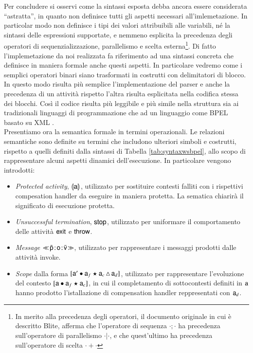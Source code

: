 Per concludere si osservi come la sintassi esposta debba ancora essere 
considerata ``astratta'', in quanto non definisce tutti gli aspetti necessari
all'imlemetazione. In particolar modo non definisce i tipi dei valori
attribuibili alle variabili, né la sintassi delle espressioni supportate, e
nemmeno esplicita la precedenza degli operatori di sequenzializzazione,
parallelismo e scelta esterna\footnote{In merito alla precedenza degli
operatori, il documento originale in cui è descritto Blite, afferma che
l'operatore di sequenza $\cdot ; \cdot$ ha precedenza
sull'operatore di parallelismo $\cdot | \cdot$, e che quest'ultimo ha precedenza
sull'operatore di scelta $\cdot + \cdot$}. Di fatto l'implemetazione da noi
realizzata fa riferimento ad una sintassi concreta che definisce in maniera
formale anche questi aspetti. In particolare vedremo come  i semplici
operatori binari siano trasformati in costrutti con 
delimitatori di blocco. In questo modo risulta più semplice
l'implementazione del parser 
e anche la
precedenza di un attività rispetto l'altra risulta esplicitata nella codifica
stessa dei blocchi. Così il codice risulta più leggibile e più simile nella
struttura sia ai tradizionali linguaggi di programmazione che ad un linguaggio come BPEL basato su XML .
\\

Presentiamo ora la semantica formale in termini operazionali. Le relazioni
semantiche sono definite su termini che includono ulteriori
simboli e costrutti, rispetto a quelli definiti dalla sintassi di Tabella
\ref{tab:syntaxwsbpel}, allo scopo di rappresentare alcuni aspetti dinamici
dell'esecuzione. In particolare vengono introdotti:

\begin{itemize}
  \item \emph{Protected activity}, $\llparenthesis {\sf a}\rrparenthesis$, utilizzato per sostituire
  contesti falliti con i rispettivi compesation handler da eseguire in maniera
  protetta. La sematica chiarirà il significato di esecuzione protetta.
  
  \item \emph{Unsuccessful termination}, ${\sf stop}$, utilizzato per uniformare il
  comportamento delle attività ${\sf exit}$ e ${\sf throw}$.
  
  \item \emph{Message} $\ll\!\tilde{{\sf p}}\! : \! {\sf o}\! : \! \bar{{\sf v}}\!\gg$, utilizzato per
  rappresentare i messaggi prodotti dalle attività invoke.
    
  \item \emph{Scope} dalla forma $[{\sf a}' \bullet {\sf a}_f \star {\sf a}_c\, \triangle\, {\sf a}_d]$,
  utilizzato per rappresentare l'evoluzione del contesto
  $[{\sf a} \bullet {\sf a}_f \star {\sf a}_c]$, in cui il completamento di sottocontesti
  definiti in ${\sf a}$ hanno prodotto l'istallazione di compensation handler
  reppresentati con ${\sf a}_d$.
\end{itemize}

